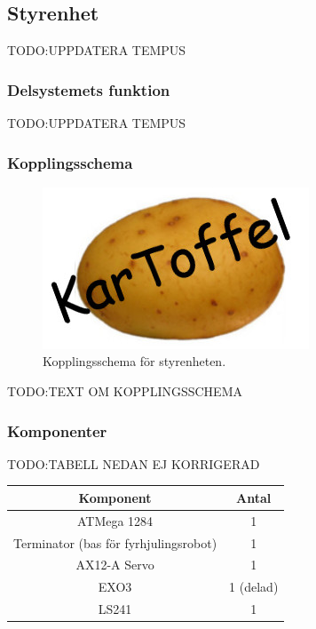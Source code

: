 \documentclass{article}
\begin{document}
\subsection{Styrenhet}
TODO:UPPDATERA TEMPUS

\subsubsection{Delsystemets funktion}
TODO:UPPDATERA TEMPUS

\subsubsection{Kopplingsschema}
\begin{figure}[H]
\centering
\includegraphics[scale=0.45]{Logo}
\caption{Kopplingsschema för styrenheten.}
\label{fig:styrenhet_kopplingsschema}
\end{figure}

TODO:TEXT OM KOPPLINGSSCHEMA

\subsubsection{Komponenter}
TODO:TABELL NEDAN EJ KORRIGERAD
\begin{table}[H]
  \centering
  \begin{tabular}{ | c | c |}
    \hline
    \textbf{Komponent} & \textbf{Antal} \\
    \hline
    ATMega 1284 & 1 \\
    \hline
    Terminator (bas för fyrhjulingsrobot) & 1 \\
    \hline
    AX12-A Servo & 1 \\
    \hline
    EXO3 & 1 (delad) \\
    \hline
    LS241 & 1 \\
    \hline
  \end{tabular}
\end{table}
\end{document}
